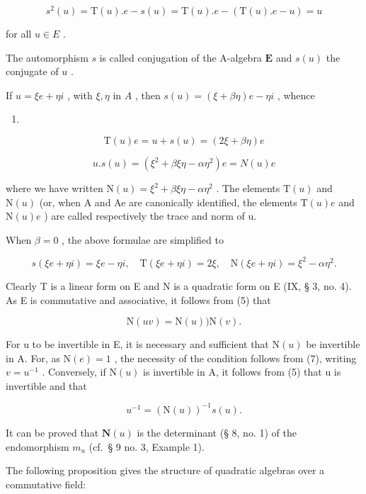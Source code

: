 \[
s ^ {2} (u) = \mathrm{T} (u). e - s (u) = \mathrm{T} (u). e - (\mathrm{T} (u). e - u) = u
\]

for all \(u \in E\) .

The automorphism \(s\) is called conjugation of the A-algebra \(\mathbf{E}\) and \(s(u)\) the conjugate of \(u\) .

If \(u = \xi e + \eta i\) , with \(\xi, \eta\) in \(A\) , then \(s(u) = (\xi + \beta \eta)e - \eta i\) , whence

\begin{enumerate}
\def\labelenumi{(\arabic{enumi})}
\setcounter{enumi}{3}
\tightlist
\item
\end{enumerate}

\[
\mathrm{T} (u) e = u + s (u) = (2 \xi + \beta \eta) e\tag{5}
\]

\[
u. s (u) = (\xi^ {2} + \beta \xi \eta - \alpha \eta^ {2}) e = N (u) e
\]

where we have written \(\mathrm{N}(u)=\xi^{2}+\beta\xi\eta-\alpha\eta^{2}\) . The elements \(\mathrm{T}(u)\) and \(\mathrm{N}(u)\) (or, when A and Ae are canonically identified, the elements \(\mathrm{T}(u)e\) and \(\mathrm{N}(u)e\) ) are called respectively the trace and norm of u.

When \(\beta = 0\) , the above formulae are simplified to

\[
s (\xi e + \eta i) = \xi e - \eta i, \quad \mathrm{T} (\xi e + \eta i) = 2 \xi , \quad \mathrm{N} (\xi e + \eta i) = \xi^ {2} - \alpha \eta^ {2}. \tag {6}
\]

Clearly T is a linear form on E and N is a quadratic form on E (IX, § 3, no. 4). As E is commutative and associative, it follows from (5) that

\[
\mathrm{N} (u v) = \mathrm{N} (u)) \mathrm{N} (v).\tag{7}
\]

For u to be invertible in E, it is necessary and sufficient that \(\mathrm{N}(u)\) be invertible in A. For, as \(\mathrm{N}(e)=1\) , the necessity of the condition follows from (7), writing \(v=u^{-1}\) . Conversely, if \(\mathrm{N}(u)\) is invertible in A, it follows from (5) that u is invertible and that

\[
u ^ {- 1} = (\mathrm{N} (u)) ^ {- 1} s (u).\tag{8}
\]

It can be proved that \(\mathbf{N}(u)\) is the determinant (§ 8, no. 1) of the endomorphism \(m_u\) (cf.~§ 9 no. 3, Example 1).

The following proposition gives the structure of quadratic algebras over a commutative field:

